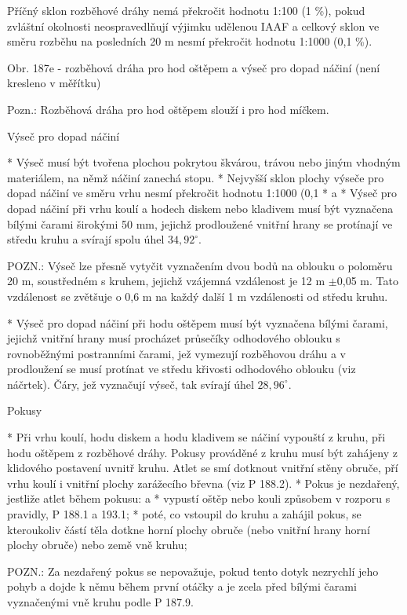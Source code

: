 Příčný sklon rozběhové dráhy nemá překročit hodnotu 1:100 (1 \%), pokud zvláštní okolnosti neospravedlňují výjimku udělenou IAAF a celkový sklon ve směru rozběhu na posledních 20 m nesmí překročit hodnotu 1:1000 (0,1 \%).

Obr. 187e - rozběhová dráha pro hod oštěpem a výseč pro dopad náčiní (není kresleno v měřítku)

Pozn.: Rozběhová dráha pro hod oštěpem slouží i pro hod míčkem.

Výseč pro dopad náčiní

* Výseč musí být tvořena plochou pokrytou škvárou, trávou nebo jiným vhodným materiálem, na němž náčiní zanechá stopu.
* Nejvyšší sklon plochy výseče pro dopad náčiní ve směru vrhu nesmí překročit hodnotu 1:1000 (0,1 %
* \begitems \style a
  * Výseč pro dopad náčiní při vrhu koulí a hodech diskem nebo kladivem musí být vyznačena bílými čarami širokými 50 mm, jejichž prodloužené vnitřní hrany se protínají ve středu kruhu a svírají spolu úhel $34,92^\circ$.

  POZN.: Výseč lze přesně vytyčit vyznačením dvou bodů na oblouku o poloměru 20 m, soustředném s kruhem, jejichž vzájemná vzdálenost je 12 m $\pm$0,05 m. Tato vzdálenost se zvětšuje o 0,6 m na každý další 1 m vzdálenosti od středu kruhu.

  * Výseč pro dopad náčiní při hodu oštěpem musí být vyznačena bílými čarami, jejichž vnitřní hrany musí procházet průsečíky odhodového oblouku s rovnoběžnými postranními čarami, jež vymezují rozběhovou dráhu a v prodloužení se musí protínat ve středu křivosti odhodového oblouku (viz náčrtek). Čáry, jež vyznačují výseč, tak svírají úhel $28,96^\circ$.
  \enditems

Pokusy

* Při vrhu koulí, hodu diskem a hodu kladivem se náčiní vypouští z kruhu, při hodu oštěpem z rozběhové dráhy. Pokusy prováděné z kruhu musí být zahájeny z klidového postavení uvnitř kruhu. Atlet se smí dotknout vnitřní stěny obruče, pří vrhu koulí i vnitřní plochy zarážecího břevna (viz P 188.2).
* Pokus je nezdařený, jestliže atlet během pokusu:
  \begitems \style a
  * vypustí oštěp nebo kouli způsobem v rozporu s pravidly, P 188.1 a 193.1;
  * poté, co vstoupil do kruhu a zahájil pokus, se kteroukoliv částí těla dotkne horní plochy obruče (nebo vnitřní hrany horní plochy obruče) nebo země vně kruhu;

  POZN.: Za nezdařený pokus se nepovažuje, pokud tento dotyk nezrychlí jeho pohyb a dojde k němu během první otáčky a je zcela před bílými čarami vyznačenými vně kruhu podle P 187.9.

